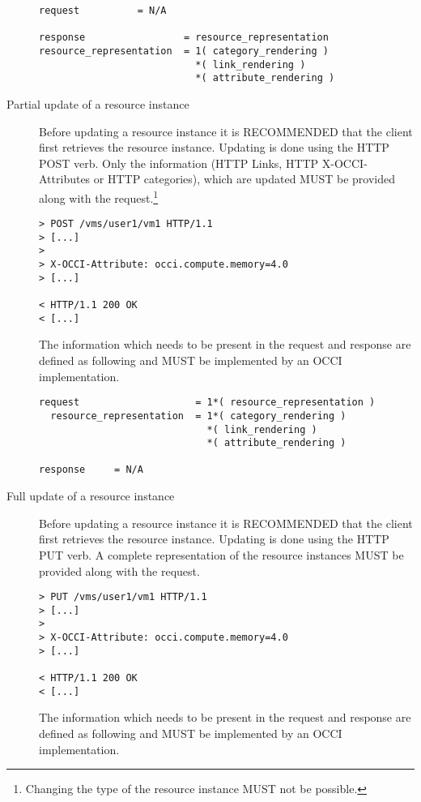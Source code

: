 \documentclass[10pt,a4paper]{article}
\begin{document}
\begin{description}
\begin{verbatim}
request          = N/A

response                 = resource_representation
resource_representation  = 1( category_rendering )
                           *( link_rendering )
                           *( attribute_rendering )
\end{verbatim}

  \item[Partial update of a resource instance] Before updating a
    resource instance it is RECOMMENDED that the client first
    retrieves the resource instance. Updating is done using the HTTP
    POST verb. Only the information (HTTP Links, HTTP
    X-OCCI-Attributes or HTTP categories), which are updated MUST be
    provided along with the request.\footnote{Changing the type of the
      resource instance MUST not be possible.}

\begin{verbatim}
> POST /vms/user1/vm1 HTTP/1.1
> [...]
> 
> X-OCCI-Attribute: occi.compute.memory=4.0
> [...]
 
< HTTP/1.1 200 OK
< [...]
\end{verbatim}

    The information which needs to be present in the request and
    response are defined as following and MUST be implemented by an
    OCCI implementation.

\begin{verbatim}
request                    = 1*( resource_representation )
  resource_representation  = 1*( category_rendering )
                             *( link_rendering )
                             *( attribute_rendering )

response     = N/A
\end{verbatim}

  \item[Full update of a resource instance] Before updating a resource
    instance it is RECOMMENDED that the client first retrieves the
    resource instance. Updating is done using the HTTP PUT verb. A
    complete representation of the resource instances MUST be provided
    along with the request.

\begin{verbatim}
> PUT /vms/user1/vm1 HTTP/1.1
> [...]
> 
> X-OCCI-Attribute: occi.compute.memory=4.0
> [...]
 
< HTTP/1.1 200 OK
< [...]
\end{verbatim}

    The information which needs to be present in the request and
    response are defined as following and MUST be implemented by an
    OCCI implementation.


\end{description}
\end{document}
